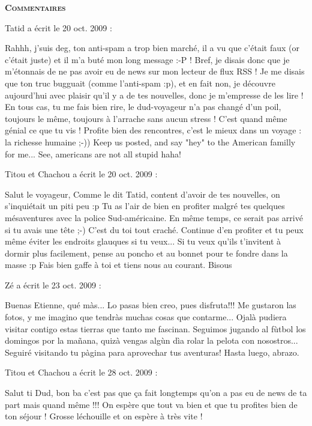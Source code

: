 \bigskip
\textbf{\textsc{Commentaires}}

\medskip
Tatid a écrit le 20 oct. 2009 :
\begin{displayquote}
Rahhh, j'suis deg, ton anti-spam a trop bien marché, il a vu que c'était faux (or c'était juste) et il m'a buté mon long message :-P !
Bref, je disais donc que je m'étonnais de ne pas avoir eu de news sur mon lecteur de flux RSS ! Je me disais que ton truc bugguait (comme l'anti-spam :p), et en fait non, je découvre aujourd'hui avec plaisir qu'il y a de tes nouvelles, donc je m'empresse de les lire !
En tous cas, tu me fais bien rire, le dud-voyageur n'a pas changé d'un poil, toujours le même, toujours à l'arrache sans aucun stress ! C'est quand même génial ce que tu vis ! Profite bien des rencontres, c'est le mieux dans un voyage : la richesse humaine ;-))
Keep us posted, and say "hey" to the American familly for me... See, americans are not all stupid haha!
\end{displayquote}

\medskip
Titou et Chachou a écrit le 20 oct. 2009 :
\begin{displayquote}
Salut le voyageur,
Comme le dit Tatid, content d'avoir de tes nouvelles, on s'inquiétait un piti peu :p
Tu as l'air de bien en profiter malgré tes quelques mésaventures avec la police Sud-américaine. En même temps, ce serait pas arrivé si tu avais une tête ;-) C'est du toi tout craché.
Continue d'en profiter et tu peux même éviter les endroits glauques si tu veux... Si tu veux qu'ils t'invitent à dormir plus facilement, pense au poncho et au bonnet pour te fondre dans la masse :p
Fais bien gaffe à toi et tiens nous au courant.
Bisous
\end{displayquote}

\medskip
Zé a écrit le 23 oct. 2009 :
\begin{displayquote}
Buenas Etienne, qué màs...
Lo pasas bien creo, pues disfruta!!!
Me gustaron las fotos, y me imagino que tendràs muchas cosas que contarme...
Ojalà pudiera visitar contigo estas tierras que tanto me fascinan.
Seguimos jugando al fùtbol los domingos por la mañana, quizà vengas algùn dìa rolar la pelota con nosostros...
Seguiré visitando tu pàgina para aprovechar tus aventuras!
Hasta luego, abrazo.
\end{displayquote}

\medskip
Titou et Chachou a écrit le 28 oct. 2009 :
\begin{displayquote}
Salut ti Dud,
bon ba c'est pas que ça fait longtemps qu'on a pas eu de news de ta part mais quand même !!! On espère que tout va bien et que tu profites bien de ton séjour !
Grosse léchouille et on espère à très vite !
\end{displayquote}

